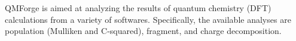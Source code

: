 QMForge is aimed at analyzing the results of quantum chemistry (DFT) calculations from a variety of softwares. Specifically, the available analyses are population (Mulliken and C-squared), fragment, and charge decomposition.